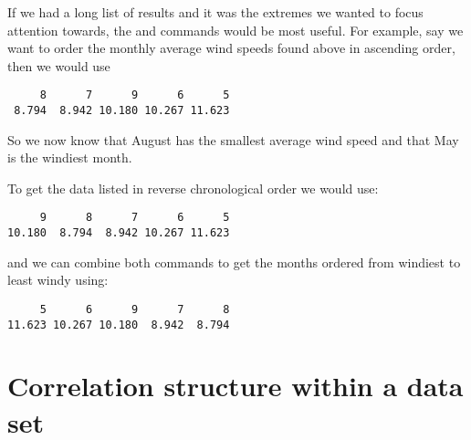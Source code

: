 If we had a long list of results and it was the extremes we wanted to focus attention towards, the  and  commands would be most useful. For example, say we want to order the monthly average wind speeds found above in ascending order, then we would use 
\begin{knitrout}
\color{fgcolor}\begin{kframe}
\begin{alltt}
\hlstd{> }\hlstd{(}
\end{alltt}
\begin{verbatim}
     8      7      9      6      5 
 8.794  8.942 10.180 10.267 11.623 
\end{verbatim}
\end{kframe}
\end{knitrout}
So we now know that August has the smallest average wind speed and that May is the windiest month. 
 
To get the data listed in reverse chronological order we would use: 
\begin{knitrout}
\color{fgcolor}\begin{kframe}
\begin{alltt}
\hlstd{> }\hlstd{(}
\end{alltt}
\begin{verbatim}
     9      8      7      6      5 
10.180  8.794  8.942 10.267 11.623 
\end{verbatim}
\end{kframe}
\end{knitrout}
and we can combine both commands to get the months ordered from windiest to least windy using: 
\begin{knitrout}
\color{fgcolor}\begin{kframe}
\begin{alltt}
\hlstd{> }\hlstd{(}\hlstd{(}
\end{alltt}
\begin{verbatim}
     5      6      9      7      8 
11.623 10.267 10.180  8.942  8.794 
\end{verbatim}
\end{kframe}
\end{knitrout}
 
\section{Correlation structure within a data set} 
\label{CorrelationStructure} 
 
